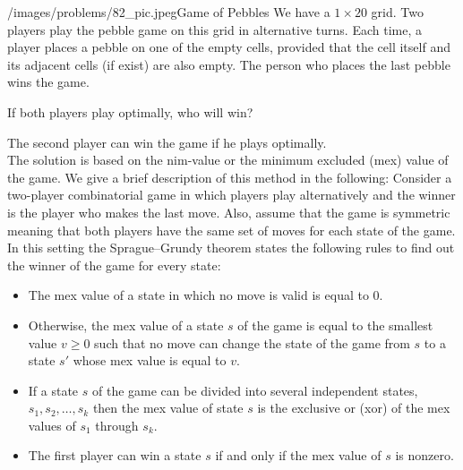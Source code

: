\begin{problem}{/images/problems/82_pic.jpeg}{Game of Pebbles} We have a $1 \times 20$ grid. Two players play the pebble game on this grid in alternative turns. Each time, a player places a pebble on one of the empty cells, provided that the cell itself and its adjacent cells (if exist) are also empty. The person who places the last pebble wins the game.
	
If both players play optimally, who will win?
\end{problem}

\begin{solution}
The second player can win the game if he plays optimally.\\[0.2cm]

The solution is based on the nim-value or the minimum excluded (mex) value of the game. We give a brief description of this method in the following: Consider a two-player combinatorial game in which players play alternatively and the winner is the player who makes the last move. Also, assume that the game is symmetric meaning that both players have the same set of moves for each state of the game. In this setting the Sprague–Grundy theorem states the following rules to find out the winner of the game for every state:
\begin{itemize}
	\item The mex value of a state in which no move is valid is equal to 0.
	\item Otherwise, the mex value of a state $s$ of the game is equal to the smallest value $v \geq 0$ such that no move can change the state of the game from $s$ to a state $s'$ whose mex value is equal to $v$.
	\item If a state $s$ of the game can be divided into several independent states, $s_1, s_2, \ldots, s_k$ then the mex value of state $s$ is the exclusive or (xor) of the mex values of $s_1$ through $s_k$.
	\item The first player can win a state $s$ if and only if the mex value of $s$ is nonzero.
\end{itemize}


\end{solution}
